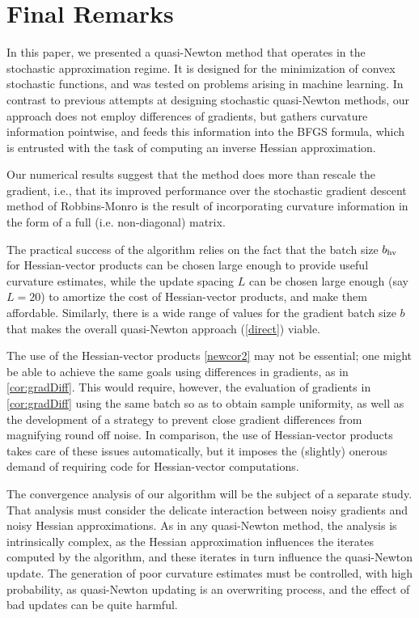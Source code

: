 \documentclass[12pt]{article}
\begin{document}
\section{Final Remarks}   \label{final}
In this paper, we presented a quasi-Newton method that operates in the stochastic approximation regime. It is designed for the minimization of convex stochastic functions, and was tested on problems arising in machine learning. In contrast to previous attempts at designing stochastic quasi-Newton methods, our approach does not employ differences of gradients, but gathers curvature information pointwise, and feeds this information into the BFGS formula, which is entrusted with the task of computing an inverse Hessian approximation. 


Our numerical results suggest that the method does more than rescale the gradient, i.e., that  its improved performance over the stochastic gradient descent method of Robbins-Monro is the result of incorporating curvature information in the form of a full (i.e. non-diagonal) matrix. 
 
 
The practical success of the algorithm relies on the fact that the batch size $b_{\rm hv} $ for Hessian-vector products can be chosen large enough to provide useful curvature estimates, while the update spacing $L$ can be chosen large enough (say $L= 20$) to amortize the cost of Hessian-vector products, and make them affordable.
Similarly, there is a wide range of values for the gradient batch size $b$ that makes the overall quasi-Newton approach (\ref{direct}) viable.
 

The use of the Hessian-vector products \eqref{newcor2} may not be essential; one might be able to achieve the same goals using differences in gradients, as in \eqref{cor:gradDiff}. 
This would require, however, the evaluation of gradients in \eqref{cor:gradDiff} using the same batch so as to obtain sample uniformity, as well as the development of a strategy to prevent close gradient differences from magnifying round off noise. In comparison, the use of Hessian-vector products takes care of these issues automatically, but it imposes the (slightly) onerous demand of requiring code for Hessian-vector computations.


The convergence analysis of our algorithm will be the subject of a separate study. That analysis must consider the delicate interaction between noisy gradients and noisy Hessian approximations. As in any quasi-Newton method, the analysis is intrinsically complex, as the Hessian approximation influences the iterates computed by the algorithm, and these iterates in turn influence the quasi-Newton update. The generation of poor curvature estimates must be controlled, with high probability, as quasi-Newton updating is an overwriting process, and the effect of bad updates can be quite harmful. 
\end{document}
